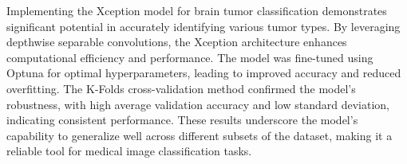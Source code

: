 Implementing the Xception model for brain tumor classification demonstrates significant potential in accurately identifying various tumor types. By leveraging depthwise separable convolutions, the Xception architecture enhances computational efficiency and performance. The model was fine-tuned using Optuna for optimal hyperparameters, leading to improved accuracy and reduced overfitting. The K-Folds cross-validation method confirmed the model's robustness, with high average validation accuracy and low standard deviation, indicating consistent performance. These results underscore the model's capability to generalize well across different subsets of the dataset, making it a reliable tool for medical image classification tasks.



